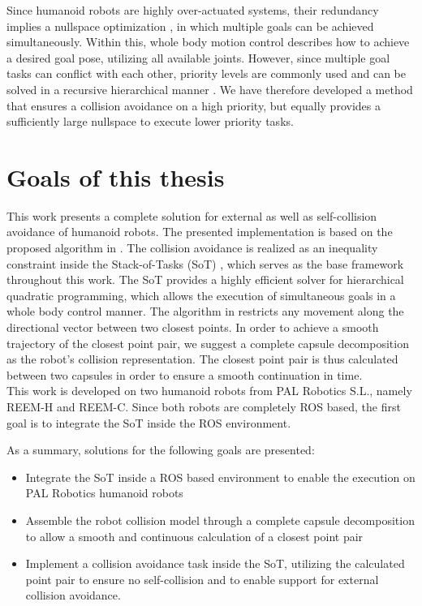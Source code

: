 Since humanoid robots are highly over-actuated systems, their redundancy implies a null\-space optimization \cite{12020}, in which multiple goals can be achieved simultaneously. Within this, whole body motion control describes how to achieve a desired goal pose, utilizing all available joints. However, since multiple goal tasks can conflict with each other, priority levels are commonly used \cite{ROB:2555180}\cite{Sentis:06} and can be solved in a recursive hierarchical manner \cite{siciliano1991general}. We have therefore developed a method that ensures a collision avoidance on a high priority, but equally provides a sufficiently large nullspace to execute lower priority tasks. 
\newpage
\section{Goals of this thesis}
This work presents a complete solution for external as well as self-collision avoidance of humanoid robots. The presented implementation is based on the proposed algorithm in \cite{stasse-icra-08}. The collision avoidance is realized as an inequality constraint inside the Stack-of-Tasks (SoT) \cite{mansard:icar:09}, which serves as the base framework throughout this work. The SoT provides a highly efficient solver for hierarchical quadratic programming, which allows the execution of simultaneous goals in a whole body control manner. The algorithm in \cite{stasse-icra-08} restricts any movement along the directional vector between two closest points. In order to achieve a smooth trajectory of the closest point pair, we suggest a complete capsule decomposition as the robot's collision representation. The closest point pair is thus calculated between two capsules in order to ensure a smooth continuation in time.\\
This work is developed on two humanoid robots from PAL Robotics S.L., namely REEM-H and REEM-C. Since both robots are completely ROS based, the first goal is to integrate the SoT inside the ROS environment. 

As a summary, solutions for the following goals are presented:
\begin{itemize}\label{item:goals}
\item Integrate the SoT inside a ROS based environment to enable the execution on PAL Robotics humanoid robots
\item Assemble the robot collision model through a complete capsule decomposition to allow a smooth and continuous calculation of a closest point pair
\item Implement a collision avoidance task inside the SoT, utilizing the calculated point pair to ensure no self-collision and to enable support for external collision avoidance.
\end{itemize}


